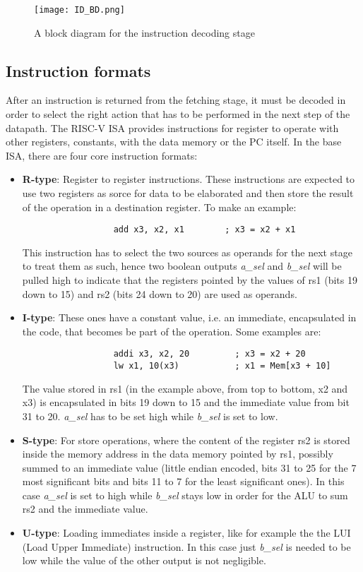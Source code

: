 \begin{figure}[ht!]
  \centering
  \texttt{[image: ID\_BD.png]}
  \caption{A block diagram for the instruction decoding stage}
  \label{fig:ID_BD}
\end{figure}

\subsection{Instruction formats}
After an instruction is returned from the fetching stage, it must be decoded in order to select the right action that has to be performed in the next step of the datapath. The RISC-V ISA provides instructions for register to operate with other registers, constants, with the data memory or the PC itself.
In the base ISA, there are four core instruction formats:
\begin{itemize}
\item \textbf{R-type}: Register to register instructions. These instructions are expected to use two registers as sorce for data to be elaborated and then store the result of the operation in a destination register. To make an example:
\begin{verbatim}
                  add x3, x2, x1        ; x3 = x2 + x1
\end{verbatim}
This instruction has to select the two sources as operands for the next stage to treat them as such, hence two boolean outputs \emph{a\_sel} and \emph{b\_sel} will be pulled high to indicate that the registers pointed by the values of rs1 (bits 19 down to 15) and rs2 (bits 24 down to 20) are used as operands.
\item \textbf{I-type}: These ones have a constant value, i.e. an immediate, encapsulated in the code, that becomes be part of the operation. Some examples are:
\begin{verbatim}
                  addi x3, x2, 20         ; x3 = x2 + 20
                  lw x1, 10(x3)           ; x1 = Mem[x3 + 10]
\end{verbatim}
The value stored in rs1 (in the example above, from top to bottom, x2 and x3) is encapsulated in bits 19 down to 15 and the immediate value from bit 31 to 20. \emph{a\_sel} has to be set high while \emph{b\_sel} is set to low.
\item \textbf{S-type}: For store operations, where the content of the register rs2 is stored inside the memory address in the data memory pointed by rs1, possibly summed to an immediate value (little endian encoded, bits 31 to 25 for the 7 most significant bits and bits 11 to 7 for the least significant ones). In this case \emph{a\_sel} is set to high while \emph{b\_sel} stays low in order for the ALU to sum rs2 and the immediate value.
\item \textbf{U-type}: Loading immediates inside a register, like for example the the LUI (Load Upper Immediate) instruction. In this case just \emph{b\_sel} is needed to be low while the value of the other output is not negligible.
\end{itemize}
